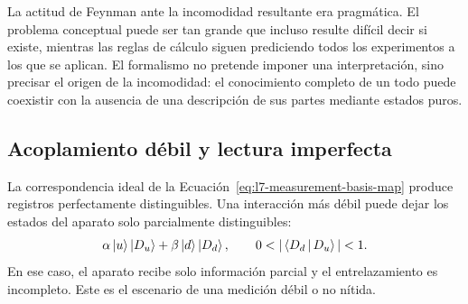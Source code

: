 La actitud de Feynman ante la incomodidad resultante era pragmática. El problema conceptual puede ser tan grande que incluso resulte difícil decir si existe, mientras las reglas de cálculo siguen prediciendo todos los experimentos a los que se aplican. El formalismo no pretende imponer una interpretación, sino precisar el origen de la incomodidad: el conocimiento completo de un todo puede coexistir con la ausencia de una descripción de sus partes mediante estados puros.

\begin{classroomqa}
\end{classroomqa}

\begin{classroomqa}
\end{classroomqa}

\subsection{Acoplamiento débil y lectura imperfecta}

La correspondencia ideal de la Ecuación~\eqref{eq:l7-measurement-basis-map} produce registros perfectamente distinguibles. Una interacción más débil puede dejar los estados del aparato solo parcialmente distinguibles:
\begin{equation}
\alpha\ket{u}\ket{D_u}
+\beta\ket{d}\ket{D_d},
\qquad
0<|\braket{D_d}{D_u}|<1.
\label{eq:l7-weak-measurement}
\end{equation}
En ese caso, el aparato recibe solo información parcial y el entrelazamiento es incompleto. Este es el escenario de una medición débil o no nítida.

